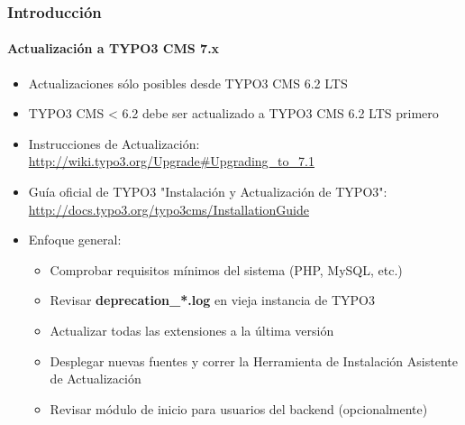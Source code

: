 \begin{frame}[fragile]
	\frametitle{Introducción}
	\framesubtitle{Actualización a TYPO3 CMS 7.x}

	\begin{itemize}
		\item Actualizaciones sólo posibles desde TYPO3 CMS 6.2 LTS
		\item TYPO3 CMS < 6.2 debe ser actualizado a TYPO3 CMS 6.2 LTS primero
	\end{itemize}

	\begin{itemize}

		\item Instrucciones de Actualización:\newline
			\smaller\url{http://wiki.typo3.org/Upgrade#Upgrading_to_7.1}\normalsize
		\item Guía oficial de TYPO3 "Instalación y Actualización de TYPO3":
			\smaller\url{http://docs.typo3.org/typo3cms/InstallationGuide}\normalsize
		\item Enfoque general:
			\begin{itemize}
				\item Comprobar requisitos mínimos del sistema \small(PHP, MySQL, etc.)
				\item Revisar \textbf{deprecation\_*.log} en vieja instancia de TYPO3
				\item Actualizar todas las extensiones a la última versión
				\item Desplegar nuevas fuentes y correr la Herramienta de Instalación \textrightarrow Asistente de Actualización
				\item Revisar módulo de inicio para usuarios del backend (opcionalmente)
			\end{itemize}
	\end{itemize}

\end{frame}

